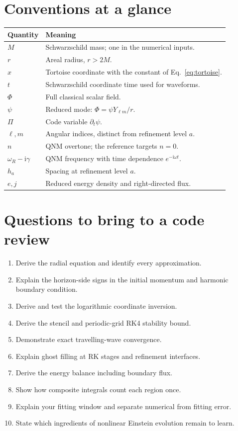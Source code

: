 \documentclass[11pt,a4paper]{article}
\numberwithin{equation}{section}
\newcommand{\ii}{\mathrm{i}}
\newcommand{\pd}{\partial}
\begin{document}
\section{Conventions at a glance}
\begin{center}
\begin{tabularx}{\textwidth}{@{}lX@{}}
\toprule
Quantity & Meaning\\
\midrule
$M$ & Schwarzschild mass; one in the numerical inputs.\\
$r$ & Areal radius, $r>2M$.\\
$x$ & Tortoise coordinate with the constant of Eq.~\eqref{eq:tortoise}.\\
$t$ & Schwarzschild coordinate time used for waveforms.\\
$\Phi$ & Full classical scalar field.\\
$\psi$ & Reduced mode: $\Phi=\psi Y_{\ell m}/r$.\\
$\Pi$ & Code variable $\pd_t\psi$.\\
$\ell,m$ & Angular indices, distinct from refinement level $a$.\\
$n$ & QNM overtone; the reference targets $n=0$.\\
$\omega_R-\ii\gamma$ & QNM frequency with time dependence $e^{-\ii\omega t}$.\\
$h_a$ & Spacing at refinement level $a$.\\
$e,j$ & Reduced energy density and right-directed flux.\\
\bottomrule
\end{tabularx}
\end{center}

\clearpage
\section{Questions to bring to a code review}
\begin{enumerate}
\item Derive the radial equation and identify every approximation.
\item Explain the horizon-side signs in the initial momentum and harmonic
      boundary condition.
\item Derive and test the logarithmic coordinate inversion.
\item Derive the stencil and periodic-grid RK4 stability bound.
\item Demonstrate exact travelling-wave convergence.
\item Explain ghost filling at RK stages and refinement interfaces.
\item Derive the energy balance including boundary flux.
\item Show how composite integrals count each region once.
\item Explain your fitting window and separate numerical from fitting error.
\item State which ingredients of nonlinear Einstein evolution remain to learn.
\end{enumerate}
\end{document}
